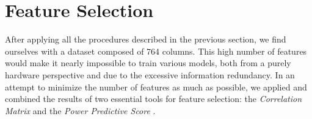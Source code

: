 \newpage
\section{Feature Selection}\label{sec:featureselection}
After applying all the procedures described in the previous section,
we find ourselves with a dataset composed of 764 columns.
This high number of features would make it nearly impossible to train various models,
both from a purely hardware perspective and due to the excessive information redundancy.
In an attempt to minimize the number of features as much as possible,
we applied and combined the results of two essential tools for feature selection:
the \textit{Correlation Matrix} \cite{corr} and the \textit{Power Predictive Score} \cite{pps}.


